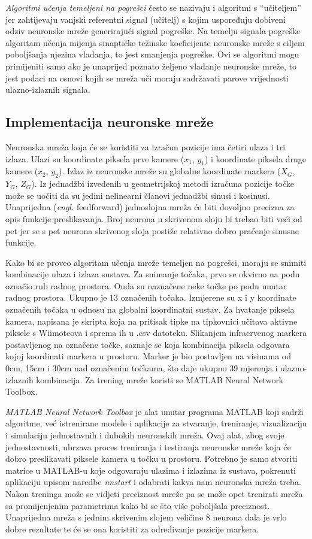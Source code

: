 \documentclass[times, utf8, diplomski]{fer}
\begin{document}
\textit{Algoritmi učenja temeljeni na pogrešci} često se nazivaju i algoritmi s “učiteljem” jer zahtijevaju vanjski referentni signal (učitelj) s kojim uspoređuju dobiveni odziv neuronske mreže generirajući signal pogreške. Na temelju signala pogreške algoritam učenja mijenja sinaptičke težinske koeficijente neuronske mreže s ciljem poboljšanja njezina vladanja, to jest smanjenja pogreške. Ovi se algoritmi mogu primijeniti samo ako je unaprijed poznato željeno vladanje neuronske mreže, to jest podaci na osnovi kojih se mreža uči moraju sadržavati parove vrijednosti ulazno-izlaznih signala.

\subsection{Implementacija neuronske mreže}
Neuronska mreža koja će se koristiti za izračun pozicije ima četiri ulaza i tri izlaza. Ulazi su koordinate piksela prve kamere ($x_1$, $y_1$) i koordinate piksela druge kamere ($x_2$, $y_2$). Izlaz iz neuronske mreže su globalne koordinate markera ($X_G$, $Y_G$, $Z_G$). Iz jednadžbi izvedenih u geometrijskoj metodi izračuna pozicije točke može se uočiti da su jedini nelinearni članovi jednadžbi sinusi i kosinusi. Unaprijedna (\textit{engl.} feedforward) jednoslojna mreža će biti dovoljno precizna za opis funkcije preslikavanja. Broj neurona u skrivenom sloju bi trebao biti veći od pet jer se s pet neurona skrivenog sloja postiže relativno dobro praćenje sinusne funkcije.

Kako bi se proveo algoritam učenja mreže temeljen na pogrešci, moraju se snimiti kombinacije ulaza i izlaza sustava. Za snimanje točaka, prvo se okvirno na podu označio rub radnog prostora. Onda su naznačene neke točke po podu unutar radnog prostora. Ukupno je 13  označenih točaka. Izmjerene su x i y koordinate označenih točaka u odnosu na globalni koordinatni sustav. Za hvatanje piksela kamera, napisana je skripta koja na pritisak tipke na tipkovnici učitava aktivne piksele s Wiimoteova i sprema ih u .csv datoteku. Slikanjem infracrvenog markera postavljenog na označene točke, saznaje se koja kombinacija piksela odgovara kojoj koordinati markera u prostoru. Marker je bio postavljen na visinama od 0cm, 15cm i 30cm nad označenim točkama, što daje ukupno 39 mjerenja i ulazno-izlaznih kombinacija. Za trening mreže koristi se MATLAB Neural Network Toolbox.

\textit{MATLAB Neural Network Toolbox} je alat unutar programa MATLAB koji sadrži algoritme, već istrenirane modele i aplikacije za stvaranje, treniranje, vizualizaciju i simulaciju jednostavnih i dubokih neuronskih mreža. Ovaj alat, zbog svoje jednostavnosti, ubrzava proces treniranja i testiranja neuronske mreže koja će dobro preslikavati piksele kamera u točku u prostoru. Potrebno je samo stvoriti matrice u MATLAB-u koje odgovaraju ulazima i izlazima iz sustava, pokrenuti aplikaciju upisom naredbe \textit{nnstart} i odabrati kakva nam neuronska mreža treba. Nakon treninga može se vidjeti preciznost mreže pa se može opet trenirati mreža sa promijenjenim parametrima kako bi se što više poboljšala preciznost. Unaprijedna mreža s jednim skrivenim slojem veličine 8 neurona dala je vrlo dobre rezultate te će se ona koristiti za određivanje pozicije markera.  
\end{document}
